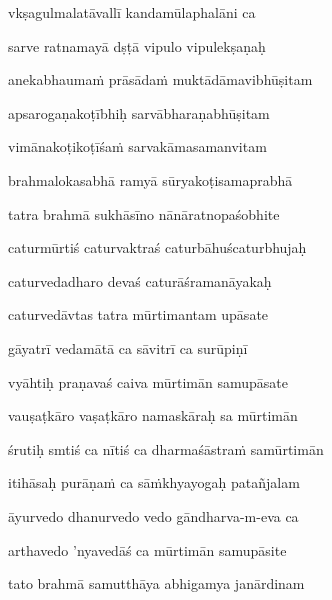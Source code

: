 vkṣagulmalatāvallī kandamūlaphalāni ca \veg\dontdisplaylinenum

sarve ratnamayā dṣṭā vipulo vipulekṣaṇaḥ\thinspace{\dandab} \dontdisplaylinenum

anekabhauma\.m prāsāda\.m muktādāmavibhūṣitam \veg\dontdisplaylinenum

apsarogaṇakoṭībhiḥ sarvābharaṇabhūṣitam\thinspace{\dandab} \dontdisplaylinenum

vimānakoṭikoṭīśa\.m sarvakāmasamanvitam \veg\dontdisplaylinenum
            \var{\vcd \om\ \Ed}%

brahmalokasabhā ramyā sūryakoṭisamaprabhā\thinspace{\dandab} \dontdisplaylinenum

tatra brahmā sukhāsīno nānāratnopaśobhite \veg\dontdisplaylinenum

caturmūrtiś caturvaktraś caturbāhuś{}caturbhujaḥ\thinspace{\dandab} \dontdisplaylinenum

caturvedadharo devaś caturāśramanāyakaḥ \veg\dontdisplaylinenum

caturvedāvtas tatra mūrtimantam upāsate\thinspace{\dandab} \dontdisplaylinenum

gāyatrī vedamātā ca sāvitrī ca surūpiṇī \veg\dontdisplaylinenum

vyāhtiḥ praṇavaś caiva mūrtimān samupāsate\thinspace{\dandab} \dontdisplaylinenum

vauṣaṭkāro vaṣaṭkāro namaskāraḥ sa mūrtimān \veg\dontdisplaylinenum

śrutiḥ smtiś ca nītiś ca dharmaśāstra\.m samūrtimān\thinspace{\dandab} \dontdisplaylinenum

itihāsaḥ purāṇa\.m ca sā\.mkhyayogaḥ patañjalam \veg\dontdisplaylinenum

āyurvedo dhanurvedo vedo gāndharva-m-eva ca\thinspace{\dandab} \dontdisplaylinenum

arthavedo 'nyavedāś ca mūrtimān samupāsite \veg\dontdisplaylinenum

tato brahmā samutthāya abhigamya janārdinam\thinspace{\dandab} \dontdisplaylinenum

